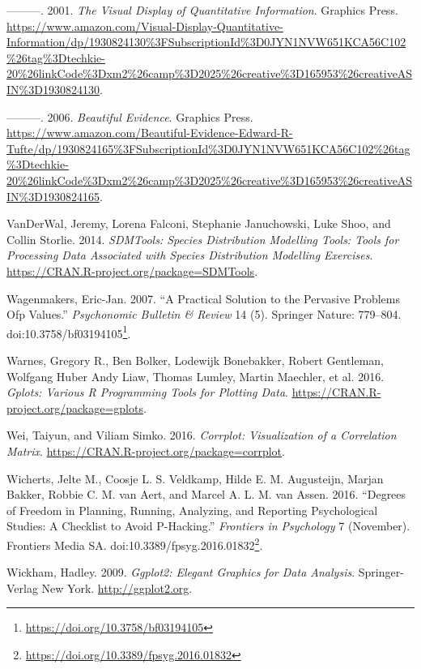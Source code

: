 \documentclass[12pt,]{book}
\renewcommand{\href}[2]{#2\footnote{\url{#1}}}
\begin{document}
\hypertarget{ref-1930824130}{}
---------. 2001. \emph{The Visual Display of Quantitative Information}.
Graphics Press.
\url{https://www.amazon.com/Visual-Display-Quantitative-Information/dp/1930824130\%3FSubscriptionId\%3D0JYN1NVW651KCA56C102\%26tag\%3Dtechkie-20\%26linkCode\%3Dxm2\%26camp\%3D2025\%26creative\%3D165953\%26creativeASIN\%3D1930824130}.

\hypertarget{ref-1930824165}{}
---------. 2006. \emph{Beautiful Evidence}. Graphics Press.
\url{https://www.amazon.com/Beautiful-Evidence-Edward-R-Tufte/dp/1930824165\%3FSubscriptionId\%3D0JYN1NVW651KCA56C102\%26tag\%3Dtechkie-20\%26linkCode\%3Dxm2\%26camp\%3D2025\%26creative\%3D165953\%26creativeASIN\%3D1930824165}.

\hypertarget{ref-R-SDMTools}{}
VanDerWal, Jeremy, Lorena Falconi, Stephanie Januchowski, Luke Shoo, and
Collin Storlie. 2014. \emph{SDMTools: Species Distribution Modelling
Tools: Tools for Processing Data Associated with Species Distribution
Modelling Exercises}. \url{https://CRAN.R-project.org/package=SDMTools}.

\hypertarget{ref-Wagenmakers2007}{}
Wagenmakers, Eric-Jan. 2007. ``A Practical Solution to the Pervasive
Problems Ofp Values.'' \emph{Psychonomic Bulletin \& Review} 14 (5).
Springer Nature: 779--804.
doi:\href{https://doi.org/10.3758/bf03194105}{10.3758/bf03194105}.

\hypertarget{ref-R-gplots}{}
Warnes, Gregory R., Ben Bolker, Lodewijk Bonebakker, Robert Gentleman,
Wolfgang Huber Andy Liaw, Thomas Lumley, Martin Maechler, et al. 2016.
\emph{Gplots: Various R Programming Tools for Plotting Data}.
\url{https://CRAN.R-project.org/package=gplots}.

\hypertarget{ref-R-corrplot}{}
Wei, Taiyun, and Viliam Simko. 2016. \emph{Corrplot: Visualization of a
Correlation Matrix}. \url{https://CRAN.R-project.org/package=corrplot}.

\hypertarget{ref-Wicherts2016}{}
Wicherts, Jelte M., Coosje L. S. Veldkamp, Hilde E. M. Augusteijn,
Marjan Bakker, Robbie C. M. van Aert, and Marcel A. L. M. van Assen.
2016. ``Degrees of Freedom in Planning, Running, Analyzing, and
Reporting Psychological Studies: A Checklist to Avoid P-Hacking.''
\emph{Frontiers in Psychology} 7 (November). Frontiers Media SA.
doi:\href{https://doi.org/10.3389/fpsyg.2016.01832}{10.3389/fpsyg.2016.01832}.

\hypertarget{ref-R-ggplot2}{}
Wickham, Hadley. 2009. \emph{Ggplot2: Elegant Graphics for Data
Analysis}. Springer-Verlag New York. \url{http://ggplot2.org}.
\end{document}
